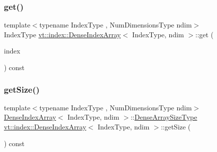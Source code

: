 \mbox{\label{structvt_1_1index_1_1_dense_index_array_aab1b5d089af92c070f2327bc15006251}} 
\subsubsection{\texorpdfstring{get()}{get()}}
{\footnotesize\ttfamily template$<$typename Index\+Type , Num\+Dimensions\+Type ndim$>$ \\
Index\+Type \hyperlink{structvt_1_1index_1_1_dense_index_array}{vt\+::index\+::\+Dense\+Index\+Array}$<$ Index\+Type, ndim $>$\+::get (\begin{DoxyParamCaption}\item[{Index\+Type const \&}]{index }\end{DoxyParamCaption}) const}

\mbox{\label{structvt_1_1index_1_1_dense_index_array_a96f8e639c73347b326a31a750a0f9e2d}} 
\subsubsection{\texorpdfstring{get\+Size()}{getSize()}}
{\footnotesize\ttfamily template$<$typename Index\+Type , Num\+Dimensions\+Type ndim$>$ \\
\hyperlink{structvt_1_1index_1_1_dense_index_array}{Dense\+Index\+Array}$<$ Index\+Type, ndim $>$\+::\hyperlink{structvt_1_1index_1_1_dense_index_array_a7a66b5cd270377310119da3d0c884224}{Dense\+Array\+Size\+Type} \hyperlink{structvt_1_1index_1_1_dense_index_array}{vt\+::index\+::\+Dense\+Index\+Array}$<$ Index\+Type, ndim $>$\+::get\+Size (\begin{DoxyParamCaption}{ }\end{DoxyParamCaption}) const}

\mbox{\label{structvt_1_1index_1_1_dense_index_array_a2c47c2a4cb636879e03281d185e19fad}} 
